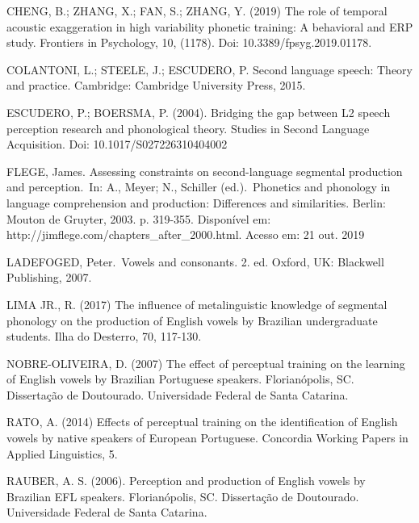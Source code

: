 CHENG, B.; ZHANG, X.; FAN, S.; ZHANG, Y. (2019) The role of temporal
acoustic exaggeration in high variability phonetic training: A behavioral and ERP study. Frontiers in Psychology, 10, (1178). Doi: 10.3389/fpsyg.2019.01178.

COLANTONI, L.; STEELE, J.; ESCUDERO, P. Second language speech:
Theory and practice. Cambridge: Cambridge University Press, 2015.

ESCUDERO, P.; BOERSMA, P. (2004). Bridging the gap between L2 speech
perception research and phonological theory. Studies in Second Language Acquisition. Doi: 10.1017/S027226310404002

FLEGE, James. Assessing constraints on second-language segmental
production and perception. In: A., Meyer; N., Schiller (ed.). Phonetics and phonology in language comprehension and production: Differences and similarities. Berlin: Mouton de Gruyter, 2003. p. 319-355. Disponível em: http://jimflege.com/chapters\_after\_2000.html. Acesso em: 21 out. 2019

LADEFOGED, Peter. Vowels and consonants. 2. ed. Oxford, UK: Blackwell
Publishing, 2007.

LIMA JR., R. (2017) The influence of metalinguistic knowledge of segmental
phonology on the production of English vowels by Brazilian undergraduate students. Ilha do Desterro, 70, 117-130.

NOBRE-OLIVEIRA, D. (2007) The effect of perceptual training on the learning
of English vowels by Brazilian Portuguese speakers. Florianópolis, SC. Dissertação de Doutourado. Universidade Federal de Santa Catarina.

RATO, A. (2014) Effects of perceptual training on the identification of English
vowels by native speakers of European Portuguese. Concordia Working Papers in Applied Linguistics, 5.

RAUBER, A. S. (2006). Perception and production of English vowels by
Brazilian EFL speakers. Florianópolis, SC. Dissertação de Doutourado. Universidade Federal de Santa Catarina.



